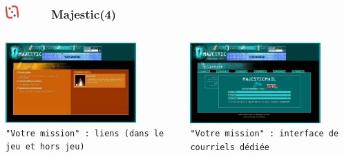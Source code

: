 \documentclass[slidetop,11pt]{beamer}
\def\sectionPartIIaV{Majestic}
\def\moreInFrameTitleLeftt{\includegraphics[height=0.5cm]{img/ligueludique-0.png}~~~~~}
\begin{document}
\begin{frame}
	\frametitle{\moreInFrameTitleLeftt \sectionPartIIaV (4) }
	\begin{columns}[T]
		\begin{column}[T]{5.05cm}
			\includegraphics[width=5.00cm]{img/majesticARGgame/majestic-screenshot-ME0000046991_2.jpg}~\\
			\texttt{\footnotesize "Votre mission" : liens (dans le jeu et hors jeu) }
		\end{column}
		\begin{column}[T]{5.05cm}
			\includegraphics[width=5.00cm]{img/majesticARGgame/majestic-screenshot-ME0000046992_2.jpg}~\\
			\texttt{\footnotesize "Votre mission" : interface de courriels d{\'e}di{\'e}e }
		\end{column}
	\end{columns}
\end{frame}
\end{document}

